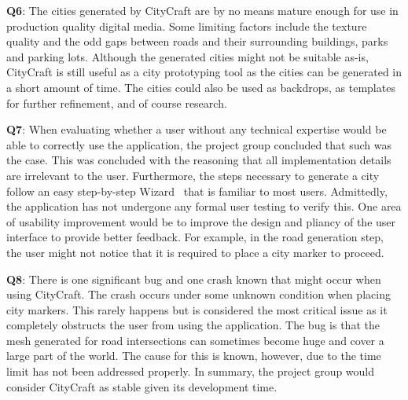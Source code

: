 \textbf{Q6}:
The cities generated by CityCraft are by no means mature enough for use in production quality digital media.
Some limiting factors include the texture quality and the odd gaps between roads and their surrounding buildings, parks and parking lots.
Although the generated cities might not be suitable as-is, CityCraft is still useful as a city prototyping tool as the cities can be generated in a short amount of time.
The cities could also be used as backdrops, as templates for further refinement, and of course research.

\textbf{Q7}:
When evaluating whether a user without any technical expertise would be able to correctly use the application, the project group concluded that such was the case.
This was concluded with the reasoning that all implementation details are irrelevant to the user.
Furthermore, the steps necessary to generate a city follow an easy step-by-step Wizard~\cite{yer_a_wizard} that is familiar to most users.
Admittedly, the application has not undergone any formal user testing to verify this.
One area of usability improvement would be to improve the design and pliancy of the user interface to provide better feedback.
For example, in the road generation step, the user might not notice that it is required to place a city marker to proceed.

\textbf{Q8}:
There is one significant bug and one crash known that might occur when using CityCraft.
The crash occurs under some unknown condition when placing city markers.
This rarely happens but is considered the most critical issue as it completely obstructs the user from using the application.
The bug is that the mesh generated for road intersections can sometimes become huge and cover a large part of the world.
The cause for this is known, however, due to the time limit has not been addressed properly.
In summary, the project group would consider CityCraft as stable given its development time.

\newpage